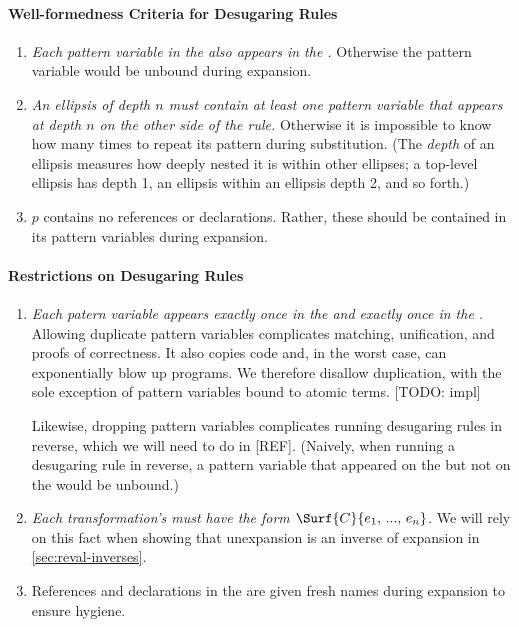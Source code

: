 \paragraph{Well-formedness Criteria for Desugaring Rules}
\begin{enumerate}
\item \emph{Each pattern variable in the  also appears in the
  .} Otherwise the pattern variable would be unbound during
  expansion.
\item \emph{An ellipsis of depth $n$ must contain at least one pattern
  variable that appears at depth $n$ on the other side of the rule.}
  Otherwise it is impossible to know how many times to repeat its
  pattern during substitution. (The \emph{depth} of an ellipsis
  measures how deeply nested it is within other ellipses; a top-level
  ellipsis has depth 1, an ellipsis within an ellipsis depth 2, and so
  forth.)
\item $p$ contains no references or declarations. Rather, these
  should be contained in its pattern variables during expansion.
\end{enumerate}

\paragraph{Restrictions on Desugaring Rules}
\begin{enumerate}
\item \emph{Each patern variable appears exactly once in the 
  and exactly once in the .}
  Allowing duplicate pattern variables complicates matching,
  unification, and proofs of correctness. It also copies code and, in
  the worst case, can exponentially blow up programs.  We therefore
  disallow duplication, with the sole exception of pattern variables
  bound to atomic terms. [TODO: impl]
  
  Likewise, dropping pattern variables complicates running desugaring
  rules in reverse, which we will need to do in [REF]. (Naively, when
  running a desugaring rule in reverse, a pattern variable that
  appeared on the  but not on the  would be unbound.)
\item \emph{Each transformation's  must have the form
  $\Surf{C}{e_1,\,...,\,e_n}$.} We will rely on this fact when showing that
  unexpansion is an inverse of expansion in \cref{sec:reval-inverses}.
\item References and declarations in the  are given fresh names during
  expansion to ensure hygiene.
\end{enumerate}

